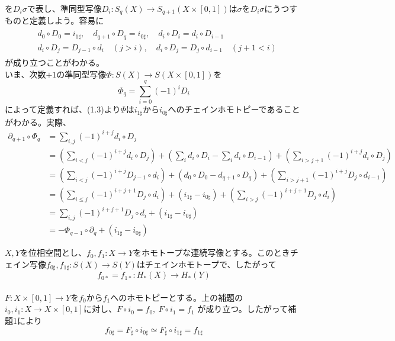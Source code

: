 \documentclass[dvipdfmx,a4paper,11pt]{jsarticle}
\begin{document}
\begin{tcolorbox}[title = 補題1,upperbox = visible]
\begin{center}
  \end{center}
  を$D_{i}\sigma$で表し、準同型写像$D_{i}: S_{q}(X)\to S_{q+1}(X\times [0,1])$は$\sigma$を$D_{i}\sigma$にうつすものと定義しよう。容易に
  \begin{align}
    \begin{alignedat}{2}
      &d_{0}\circ D_{0}=i_{1\sharp},\quad d_{q+1}\circ D_{q}=i_{0\sharp},\quad d_{i}\circ D_{i}=d_{i}\circ D_{i-1}\\
      &d_{i}\circ D_{j}=D_{j-1}\circ d_{i}\quad (j>i),\quad d_{i}\circ D_{j}=D_{j}\circ d_{i-1}\quad (j+1<i) 
    \end{alignedat}
  \end{align}
  が成り立つことがわかる。\\
  いま、次数$+1$の準同型写像$\Phi : S(X)\to S(X\times [0,1])$を
  \begin{equation*}
    \Phi_{q}=\sum_{i=0}^{q}(-1)^{i}D_{i}
  \end{equation*}
  によって定義すれば、(1.3)より$\Phi$は$i_{1\sharp}$から$i_{0\sharp}$へのチェインホモトピーであることがわかる。実際、
  \begin{align*}
    \partial_{q+1}\circ \Phi_{q}
    &=\sum_{i,j}(-1)^{i+j}d_{i}\circ D_{j}\\
    &=(\sum_{i<j}(-1)^{i+j}d_{i}\circ D_{j})+(\sum_{i}d_{i}\circ D_{i}-\sum_{i}d_{i}\circ D_{i-1})+(\sum_{i>j+1}(-1)^{i+j}d_{i}\circ D_{j})\\
    &=(\sum_{i<j}(-1)^{i+j}D_{j-1}\circ d_{i})+(d_{0}\circ D_{0}-d_{q+1}\circ D_{q})+(\sum_{i>j+1}(-1)^{i+j}D_{j}\circ d_{i-1})\\
    &=(\sum_{i\leq j}(-1)^{i+j+1}D_{j}\circ d_{i})+(i_{1\sharp}-i_{0\sharp})+(\sum_{i>j}(-1)^{i+j+1}D_{j}\circ d_{i})\\
    &=\sum_{i,j}(-1)^{i+j+1}D_{j}\circ d_{i}+(i_{1\sharp}-i_{0\sharp})\\
    &=-\Phi_{q-1}\circ \partial_{q}+(i_{1\sharp}-i_{0\sharp})
  \end{align*}
\end{tcolorbox}

\clearpage

\begin{tcolorbox}[title = 定理1,upperbox = visible]
  $X,Y$を位相空間とし、$f_{0},f_{1}:X\to Y$をホモトープな連続写像とする。このときチェイン写像$f_{0\sharp},f_{1\sharp}:S(X)\to S(Y)$はチェインホモトープで、したがって
  \begin{equation*}
    f_{0*}=f_{1*}:H_{*}(X)\to H_{*}(Y)
  \end{equation*}
  \tcblower
  \\
  $F:X\times [0,1]\to Y$を$f_{0}$から$f_{1}$へのホモトピーとする。上の補題の
  $i_{0},i_{1}:X\to X\times [0,1]$に対し、$F\circ i_{0}=f_{0},\ F\circ i_{1}=f_{1}$
  が成り立つ。したがって補題1により
  \begin{equation*}
    f_{0\sharp}=F_{\sharp}\circ i_{0\sharp}\simeq F_{\sharp}\circ i_{1\sharp}=f_{1\sharp}
  \end{equation*}
\end{tcolorbox}
\end{document}
